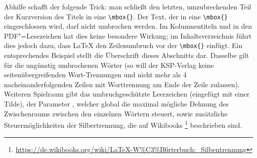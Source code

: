 Abhilfe schafft der folgende Trick:
man schließt den letzten, umzubrechenden Teil der Kurzversion des Titels in eine \verb+\mbox{}+.
Der Text, der in eine \verb+\mbox{}+ eingeschlossen wird, darf nicht umbrochen werden.
Im Kolumnentiteln und in den PDF"=Lesezeichen hat dies keine besondere Wirkung;
im Inhaltsverzeichnis führt dies jedoch dazu, dass \LaTeX{} den Zeilenumbruch vor der \verb+\mbox{}+ einfügt.
Ein entsprechendes Beispiel stellt die Überschrift dieses Abschnitts dar.
Dasselbe gilt für die ungünstig umbrochenen Wörter
(so will der KSP-Verlag keine seitenübergreifenden Wort-Trennungen und nicht mehr als 4 nacheinanderfolgenden Zeilen mit Worttrennung am Ende der Zeile zulassen).
Weiteren Spielraum gibt das umbruchgeschützte Leerzeichen (eingefügt mit einer Tilde),
der Parameter , welcher global die maximal mögliche Dehnung des Zwischenraums zwischen den einzelnen Wörtern steuert,
sowie zusätzliche Steuermöglichkeiten der Silbertrennung, die auf Wikibooks%
\footnote{\url{https://de.wikibooks.org/wiki/LaTeX-W%C3%B6rterbuch:_Silbentrennung}}
beschrieben sind.